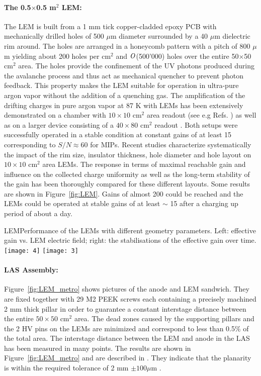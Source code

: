 \paragraph{The 0.5$\times$0.5 m$^2$ LEM:}
The LEM is built from a 1 mm tick copper-cladded epoxy PCB with mechanically drilled holes of 500 $\mu$m diameter surrounded by a 40 $\mu$m dielectric rim around. The holes are arranged in a honeycomb pattern with a pitch of 800 $\mu$m yielding about 200 holes per cm$^2$ and $\it O$(500'000) holes over the entire 50$\times$50 cm$^2$ area. The holes provide the confinement of the UV photons produced during the avalanche process and thus act as mechanical quencher to prevent photon feedback. This property makes the LEM suitable for operation in ultra-pure argon vapor without the addition  of a quenching gas. The amplification of the drifting charges in pure argon vapor at 87 K with LEMs has been extensively demonstrated on a chamber with $10\times10$ cm$^2$ area readout (see e.g Refs. \cite{Badertscher:2008rf,Badertscher:2010fi} ) as well as on a larger device consisting of a $40\times80$ cm$^2$ readout  \cite{Badertscher:2013wm}.  Both setups were successfully operated in a stable condition at constant gains of at least 15 corresponding to $S/N\approx 60$ for MIPs. Recent studies \cite{Cantini:2014xza}  characterize systematically the impact of the rim size, insulator thickness, hole diameter and hole layout on $10\times10$ cm$^2$ area LEMs. The response in terms of maximal reachable gain and influence on the collected charge uniformity as well as the long-term stability of the gain has been thoroughly compared for these different layouts. Some results are shown in Figure~\ref{fig:LEM}.  Gains of almost 200 could be reached and the LEMs could be operated at stable gains of at least $\sim$ 15 after a charging up period of about a day.

\begin{cdrfigure}{LEM}{Performance of the LEMs with different geometry parameters. Left: effective gain vs. LEM electric field; right: the stabilisations of the effective gain over time.}
\texttt{[image: 4]}
\texttt{[image: 3]}
\end{cdrfigure}

\paragraph{LAS Assembly:}

Figure~\ref{fig:LEM_metro} shows pictures of the anode and LEM sandwich.  They are fixed together with 29 M2 PEEK screws each containing a precisely machined 2 mm thick pillar in order to guarantee a  constant interstage distance between the entire $50\times50$ cm$^2$ area. The dead zones caused by the supporting pillars and the 2 HV  pins on the LEMs are minimized and correspond to less than 0.5\% of the total area. The interstage distance between the LEM and anode in the LAS has been measured  in many points. The results are shown in Figure~\ref{fig:LEM_metro} and are described in \cite{EDMS_metro_lem_anode}. They indicate that the planarity is within the required tolerance of 2 mm $\pm 100 \mu$m .

